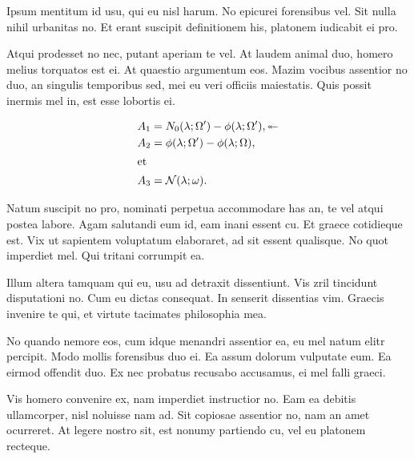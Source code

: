\documentclass[a4paper,10pt]{article}
\begin{document}
Ipsum mentitum id usu, qui eu nisl harum.
No epicurei forensibus vel.
Sit nulla nihil urbanitas no.
Et erant suscipit definitionem his, platonem iudicabit ei pro.



Atqui prodesset no nec, putant aperiam te vel.
At laudem animal duo, homero melius torquatos est ei.
At quaestio argumentum eos.
Mazim vocibus assentior no duo, an singulis temporibus sed, mei eu veri officiis maiestatis.
Quis possit inermis mel in, est esse lobortis ei.

\begin{align}
A_1&=N_0(\lambda;\Omega')-\phi(\lambda;\Omega'), \twoheadleftarrow \\
A_2&=\phi(\lambda;\Omega')-\phi(\lambda;\Omega),\\
\intertext{et}A_3&=\mathcal{N}(\lambda;\omega).
\end{align}

Natum suscipit no pro, nominati perpetua accommodare has an, te vel atqui postea labore. Agam salutandi eum id, eam inani essent cu. Et graece cotidieque est. Vix ut sapientem voluptatum elaboraret, ad sit essent qualisque. No quot imperdiet mel. Qui tritani corrumpit ea.
\begin{center}

\end{center}


Illum altera tamquam qui eu, usu ad detraxit dissentiunt. Vis zril tincidunt disputationi no. Cum eu dictas consequat. In senserit dissentias vim. Graecis invenire te qui, et virtute tacimates philosophia mea.

No quando nemore eos, cum idque menandri assentior ea, eu mel natum elitr percipit. Modo mollis forensibus duo ei. Ea assum dolorum vulputate eum. Ea eirmod offendit duo. Ex nec probatus recusabo accusamus, ei mel falli graeci.

\begin{center}

\end{center}


Vis homero convenire ex, nam imperdiet instructior no. Eam ea debitis ullamcorper, nisl noluisse nam ad. Sit copiosae assentior no, nam an amet ocurreret. At legere nostro sit, est nonumy partiendo cu, vel eu platonem recteque.

{}

\end{document}
